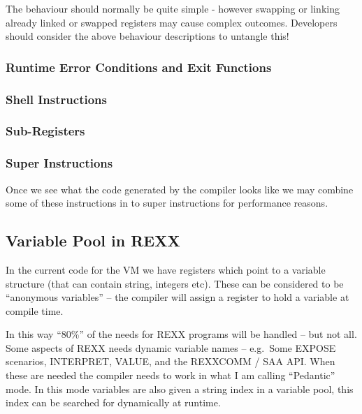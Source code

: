 The behaviour should normally be quite simple - however swapping or
linking already linked or swapped registers may cause complex outcomes.
Developers should consider the above behaviour descriptions to untangle
this!

\hypertarget{runtime-error-conditions-and-exit-functions}{%
\subsubsection{Runtime Error Conditions and Exit
Functions}\label{runtime-error-conditions-and-exit-functions}}

\hypertarget{shell-instructions}{%
\subsubsection{Shell Instructions}\label{shell-instructions}}

\hypertarget{sub-registers}{%
\subsubsection{Sub-Registers}\label{sub-registers}}

\hypertarget{super-instructions}{%
\subsubsection{Super Instructions}\label{super-instructions}}

Once we see what the code generated by the compiler looks like we may
combine some of these instructions in to super instructions for
performance reasons.

\hypertarget{variable-pool-in-rexx}{%
\subsection{Variable Pool in REXX}\label{variable-pool-in-rexx}}

In the current code for the VM we have registers which point to a
variable structure (that can contain string, integers etc). These can be
considered to be ``anonymous variables'' -- the compiler will assign a
register to hold a variable at compile time.

In this way ``80\%'' of the needs for REXX programs will be handled --
but not all. Some aspects of REXX needs dynamic variable names --
e.g.~Some EXPOSE scenarios, INTERPRET, VALUE, and the REXXCOMM / SAA
API. When these are needed the compiler needs to work in what I am
calling ``Pedantic'' mode. In this mode variables are also given a
string index in a variable pool, this index can be searched for
dynamically at runtime.

